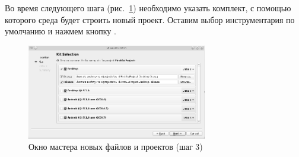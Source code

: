 Во время следующего шага (рис.~\ref{ch11:refDrawing4}) необходимо указать
комплект, с помощью которого среда будет строить новый проект. Оставим выбор
инструментария по умолчанию и нажмем кнопку .

\begin{figure}[htb]
\begin{center}
\includegraphics[width=0.7\textwidth]{img/ris_11_5}
\caption{Окно мастера новых файлов и проектов (шаг 3)}
\label{ch11:refDrawing4}
\end{center}
\end{figure}

